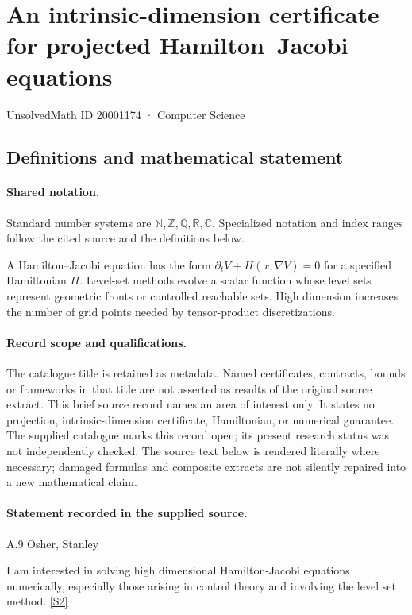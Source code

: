 \documentclass[11pt]{article}
\newcommand{\sref}[2]{\hyperlink{source:#1:#2}{[S#2]}}
\begin{document}
\setcounter{section}{20001173}
\section{An intrinsic-dimension certificate for projected Hamilton--Jacobi equations}\label{20001174}
{\small\sffamily UnsolvedMath ID 20001174 · Computer Science}
\subsection{Definitions and mathematical statement}

\paragraph{Shared notation.}Standard number systems are $\mathbb N,\mathbb Z,\mathbb Q,\mathbb R,\mathbb C$. Specialized notation and index ranges follow the cited source and the definitions below.


A Hamilton--Jacobi equation has the form $\partial_tV+H(x,\nabla V)=0$ for a specified Hamiltonian $H$. Level-set methods evolve a scalar function whose level sets represent geometric fronts or controlled reachable sets. High dimension increases the number of grid points needed by tensor-product discretizations.
\paragraph{Record scope and qualifications.}
The catalogue title is retained as metadata. Named certificates, contracts, bounds or frameworks in that title are not asserted as results of the original source extract.
This brief source record names an area of interest only. It states no projection, intrinsic-dimension certificate, Hamiltonian, or numerical guarantee. The supplied catalogue marks this record open; its present research status was not independently checked.
The source text below is rendered literally where necessary; damaged formulas and composite extracts are not silently repaired into a new mathematical claim.
\paragraph{Statement recorded in the supplied source.}
A.9 Osher, Stanley

I am interested in solving high dimensional Hamilton-Jacobi equations numerically, especially those arising in control theory and involving the level set method. \sref{20001174}{2}
\end{document}
